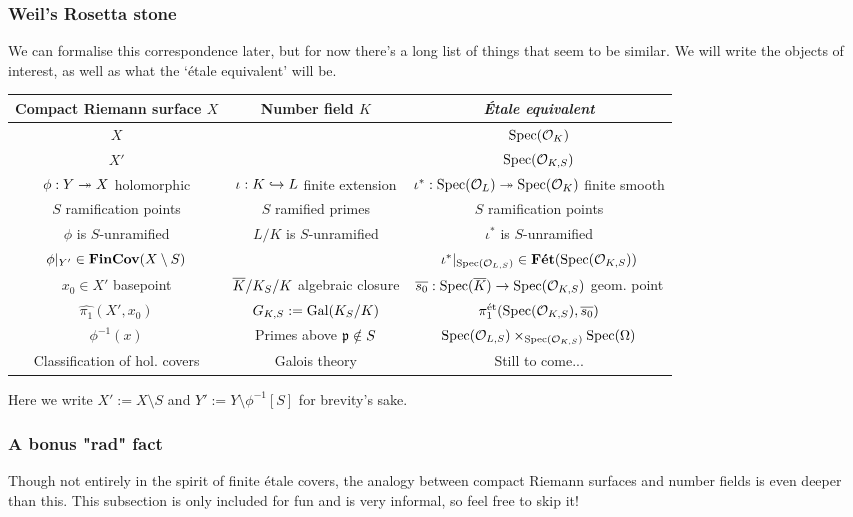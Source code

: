 \subsubsection{Weil's Rosetta stone}
\label{subsubsec:1_2_3_rosetta_stone}
We can formalise this correspondence later, but for now there's a long list of things that seem to be similar. We will write the objects of interest, as well as what the `\'etale equivalent' will be.
\begin{center}
	\begin{tabular}{c|c|c}
		\textbf{Compact Riemann surface} $X$ & \textbf{Number field} $K$ & \emph{\'Etale equivalent} \\
		\hline
		$X$ & & $\mathrm{Spec}(\mathcal{O}_K)$ \\
		$X'$ &  & $\mathrm{Spec}(\mathcal{O}_{K,S})$ \\
		$\phi : Y \twoheadrightarrow X$ holomorphic & $\iota : K \hookrightarrow L$ finite extension & $\iota^* : \mathrm{Spec}(\mathcal{O}_L) \twoheadrightarrow \mathrm{Spec}(\mathcal{O}_K)$ finite smooth \\
		$S$ ramification points & $S$ ramified primes & $S$ ramification points \\
		$\phi$ is $S$-unramified  & $L/K$ is $S$-unramified & $\iota^*$ is $S$-unramified\\
		$\phi|_{Y'} \in \mathbf{FinCov}(X\setminus S)$ & & $\iota^*|_{\mathrm{Spec}(\mathcal{O}_{L,S})} \in \mathbf{F\acute{e}t}(\mathrm{Spec}(\mathcal{O}_{K,S}))$ \\
		$x_0 \in X'$ basepoint & $\overline{K}/K_S/K$ algebraic closure & $\overline{s_0}:\mathrm{Spec}(\overline{K}) \to \mathrm{Spec}(\mathcal{O}_{K,S})$ geom. point \\
		$\widehat{\pi_1}(X', x_0)$ & $G_{K,S}:=\mathrm{Gal}(K_S/K)$ & $\pi_1^{\mathrm{\acute{e}t}}(\mathrm{Spec}(\mathcal{O}_{K,S}), \overline{s_0})$ \\
		$\phi^{-1}(x)$ & Primes above $\mathfrak{p} \notin S$ & $\mathrm{Spec}(\mathcal{O}_{L,S}) \times_{\mathrm{Spec}(\mathcal{O}_{K,S})} \mathrm{Spec}(\Omega)$\\
		Classification of hol. covers & Galois theory & Still to come...
	\end{tabular}
\end{center}

Here we write $X' := X \setminus S$ and $Y' := Y \setminus \phi^{-1}[S]$ for brevity's sake.

\subsubsection{A bonus "rad" fact}
Though not entirely in the spirit of finite \'etale covers, the analogy between compact Riemann surfaces and number fields is even deeper than this. This subsection is only included for fun and is very informal, so feel free to skip it!\\


